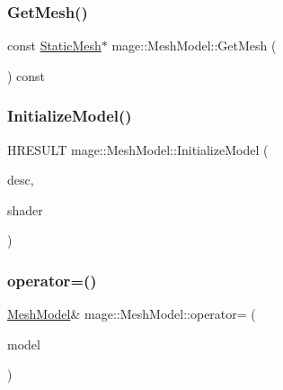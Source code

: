\subsubsection{\texorpdfstring{Get\+Mesh()}{GetMesh()}}
{\footnotesize\ttfamily const \hyperlink{classmage_1_1_static_mesh}{Static\+Mesh}$\ast$ mage\+::\+Mesh\+Model\+::\+Get\+Mesh (\begin{DoxyParamCaption}{ }\end{DoxyParamCaption}) const}

\hypertarget{classmage_1_1_mesh_model_a9971552f5c866b8ed221df056c46a42d}{}\label{classmage_1_1_mesh_model_a9971552f5c866b8ed221df056c46a42d} 
\subsubsection{\texorpdfstring{Initialize\+Model()}{InitializeModel()}}
{\footnotesize\ttfamily H\+R\+E\+S\+U\+LT mage\+::\+Mesh\+Model\+::\+Initialize\+Model (\begin{DoxyParamCaption}\item[{const \hyperlink{classmage_1_1_model_descriptor}{Model\+Descriptor} \&}]{desc,  }\item[{const \hyperlink{structmage_1_1_combined_shader}{Combined\+Shader} \&}]{shader }\end{DoxyParamCaption})\hspace{0.3cm}{\ttfamily [private]}}

\hypertarget{classmage_1_1_mesh_model_a0cffe92f76d2470c67ae71a5a4046259}{}\label{classmage_1_1_mesh_model_a0cffe92f76d2470c67ae71a5a4046259} 
\subsubsection{\texorpdfstring{operator=()}{operator=()}\hspace{0.1cm}{\footnotesize\ttfamily [1/2]}}
{\footnotesize\ttfamily \hyperlink{classmage_1_1_mesh_model}{Mesh\+Model}\& mage\+::\+Mesh\+Model\+::operator= (\begin{DoxyParamCaption}\item[{const \hyperlink{classmage_1_1_mesh_model}{Mesh\+Model} \&}]{model }\end{DoxyParamCaption})\hspace{0.3cm}{\ttfamily [delete]}}


